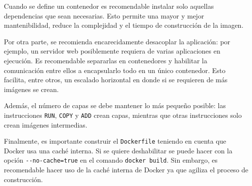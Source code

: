 Cuando se define un contenedor es recomendable instalar solo aquellas dependencias
que sean necesarias. Esto permite una mayor y mejor mantenibilidad, reduce la complejidad
y el tiempo de construcción de la imagen.

Por otra parte, se recomienda encarecidamente desacoplar la aplicación: por ejemplo,
un servidor web posiblemente requiera de varias aplicaciones en ejecución. Es recomendable
separarlas en contenedores y habilitar la comunicación entre ellos a encapsularlo todo
en un único contenedor. Esto facilita, entre otros, un escalado horizontal en donde
si se requieren de más imágenes se crean.

Además, el número de capas se debe mantener lo más pequeño posible: las instrucciones
\texttt{RUN}, \texttt{COPY} y \texttt{ADD} crean capas, mientras que otras instrucciones
solo crean imágenes intermedias.

Finalmente, es importante construir el \texttt{Dockerfile} teniendo en cuenta que Docker
usa una caché interna. Si se quiere deshabilitar se puede hacer con la opción
\lstinline[style=bash]!--no-cache=true! en el comando \lstinline[style=bash]!docker build!.
Sin embargo, es recomendable hacer uso de la caché interna de Docker ya que agiliza
el proceso de construcción.